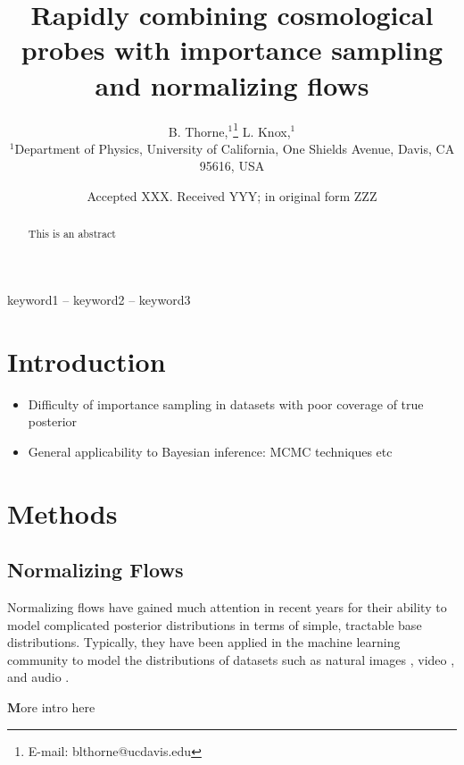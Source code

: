 \documentclass[fleqn,usenatbib]{mnras}
\title[Importance sampling with normalizing flows]{Rapidly combining cosmological probes with importance sampling and normalizing flows }
\author[B. Thorne]{
B. Thorne,$^{1}$\thanks{E-mail: blthorne@ucdavis.edu}
L. Knox,$^{1}$
\\
$^{1}$Department of Physics, University of California, One Shields Avenue, Davis, CA 95616, USA\\
}
\date{Accepted XXX. Received YYY; in original form ZZZ}
\begin{document}
\label{firstpage}
\pagerange{\pageref{firstpage}--\pageref{lastpage}}
\maketitle

\begin{abstract}
This is an abstract
\end{abstract}

\begin{keywords}
keyword1 -- keyword2 -- keyword3
\end{keywords}



\section{Introduction}

\begin{itemize}
    \item Difficulty of importance sampling in datasets with poor coverage of true posterior
    \item General applicability to Bayesian inference: MCMC techniques etc
\end{itemize}

\section{Methods}

\subsection{Normalizing Flows}
\label{sec:normalizing_flows} %

Normalizing flows have gained much attention in recent years for their ability to model complicated posterior distributions in terms of simple, tractable base distributions. Typically, they have been applied in the machine learning community to model the distributions of datasets such as natural images \citep{ho/etal:2019, grathwohl/etal:2018, kingma/dhariwal:2018}, video \citep{kumar/etal:2019}, and audio \citep{kim/etal:2018}. 

{\textbf More intro here}
\end{document}
